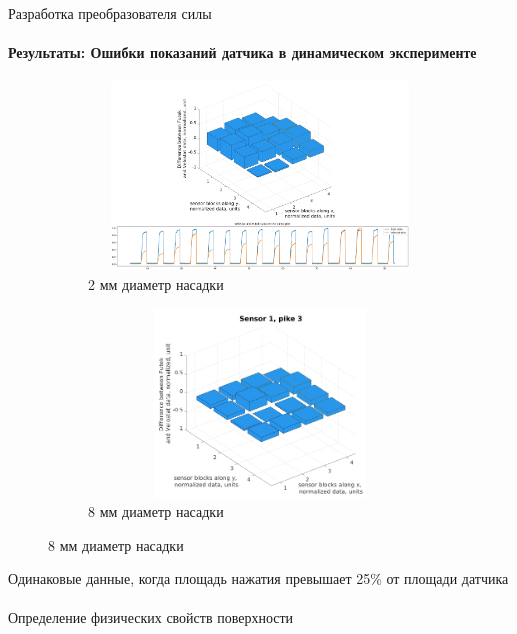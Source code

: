 \documentclass[aspectratio=169,xcolor=table]{beamer}
\begin{document}
\begin{frame}[t]{Разработка преобразователя силы}
    \framesubtitle{Результаты: Ошибки показаний датчика в динамическом эксперименте}
    \vspace{-15pt}
    \begin{figure}[H]
        \begin{subfigure}{0.64\textwidth}
            \centering\includegraphics[height=5cm,width=1\textwidth,keepaspectratio]{sens1_pike1_mod.png}
            \caption*{2 мм диаметр насадки}
            \label{fig:sens1_pike1}
        \end{subfigure}
        \begin{subfigure}{0.34\textwidth}
            \centering\includegraphics[height=5cm,width=1\textwidth,keepaspectratio]{sens1_pike3.png}
            \caption*{8 мм диаметр насадки}
            \label{fig:sens1_pike3}
        \end{subfigure}
    \end{figure}
    \vspace{-0.8cm}
    \alert{Одинаковые данные, когда площадь нажатия превышает 25\% от площади датчика}
\end{frame}

\begin{frame}[c]{}
    \framesubtitle{}
    \centering\LARGE Определение физических свойств поверхности
\end{frame}
\end{document}
